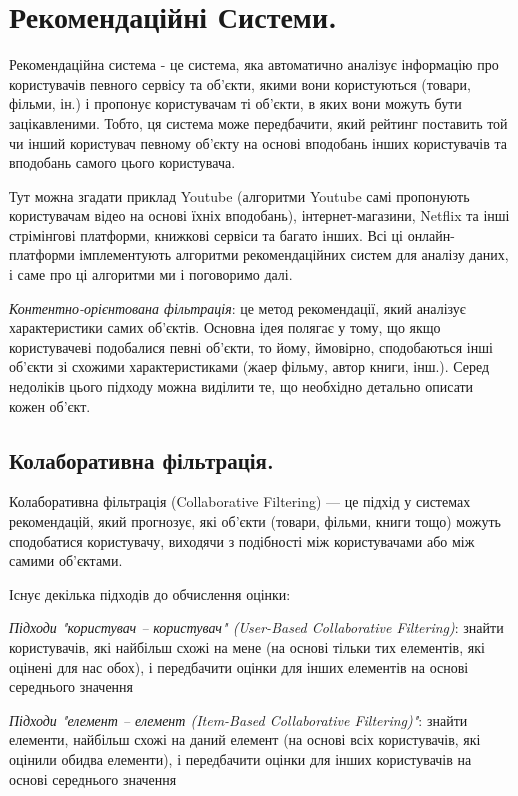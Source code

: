 \chapter{Рекомендаційні Системи.}

Рекомендаційна система  - це система, яка автоматично аналізує інформацію про користувачів певного сервісу та об'єкти, якими вони користуються (товари, фільми, ін.) і пропонує користувачам ті об'єкти, в яких вони можуть бути зацікавленими. Тобто, ця система може передбачити, який рейтинг поставить той чи інший користувач певному об'єкту на основі вподобань інших користувачів та вподобань самого цього користувача. 

Тут можна згадати приклад Youtube (алгоритми Youtube самі пропонують користувачам відео на основі їхніх вподобань), інтернет-магазини, Netflix та інші стрімінгові платформи, книжкові сервіси та багато інших. Всі ці онлайн-платформи імплементують алгоритми рекомендаційних систем для аналізу даних, і саме про ці алгоритми ми і поговоримо далі. 

\textit{Контентно-орієнтована фільтрація}: це метод рекомендації, який аналізує характеристики самих об'єктів. Основна ідея полягає у тому, що якщо користувачеві подобалися певні об'єкти, то йому, ймовірно, сподобаються інші об'єкти зі схожими характеристиками (жаер фільму, автор книги, інш.). Серед недоліків цього підходу можна виділити те, що необхідно детально описати кожен об'єкт. 

\section{Колаборативна фільтрація.}

Колаборативна фільтрація (Collaborative Filtering) — це підхід у системах рекомендацій, який прогнозує,
які об’єкти (товари, фільми, книги тощо) можуть сподобатися користувачу,
виходячи з подібності між користувачами або між самими об’єктами. 

Існує декілька підходів до обчислення оцінки:

\textit{Підходи "користувач – користувач" (User-Based Collaborative Filtering)}: знайти користувачів, які найбільш схожі на мене (на основі 
тільки тих елементів, які оцінені для нас обох), і передбачити оцінки для інших 
елементів на основі середнього значення 

\textit{Підходи "елемент – елемент (Item-Based Collaborative Filtering)"}: знайти елементи, найбільш схожі на даний елемент (на основі 
всіх користувачів, які оцінили обидва елементи), і передбачити оцінки для інших користувачів на основі 
середнього значення

